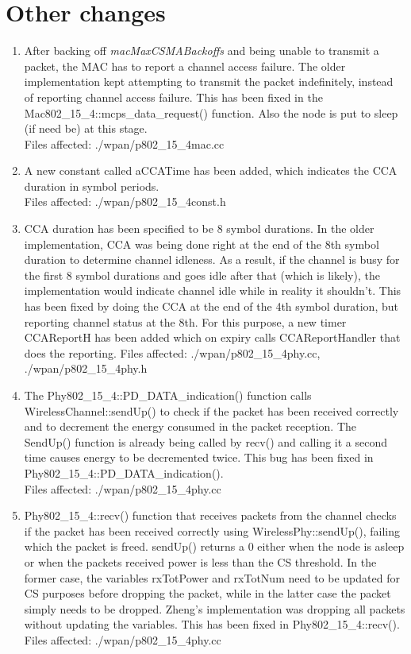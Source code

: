 \section{Other changes}
\begin{enumerate}
\item{After backing off \textit{macMaxCSMABackoffs} and being unable to transmit a packet,
the MAC has to report a channel access failure. The older implementation kept attempting to
transmit the packet indefinitely, instead of reporting channel access failure.
This has been fixed in the \mbox{Mac802\_15\_4::mcps\_data\_request()} function.
Also the node is put to sleep (if need be) at this stage.\\
Files affected: ./wpan/p802\_15\_4mac.cc}

\item{A new constant called aCCATime has been added, which indicates the CCA
duration in symbol periods.\\
Files affected:  ./wpan/p802\_15\_4const.h}

\item{CCA duration has been specified to be 8 symbol durations. In the older implementation,
CCA was being done right at the end of the 8th symbol duration to determine
channel idleness. As a result, if the channel is busy for the first
8 symbol durations and goes idle after that (which is likely), the
implementation would indicate channel idle while in reality it
shouldn't. This has been fixed by doing the CCA at the end of the
4th symbol duration, but reporting channel status at the 8th. For
this purpose, a new timer CCAReportH has been added which on expiry calls
CCAReportHandler that does the reporting.
Files affected:  ./wpan/p802\_15\_4phy.cc,  ./wpan/p802\_15\_4phy.h}

\item{The \mbox{Phy802\_15\_4::PD\_DATA\_indication()} function calls
\mbox{WirelessChannel::sendUp()} to check if the packet has been received correctly and
to decrement the energy consumed in the packet reception. The SendUp() function is already
being called by recv() and calling it a second time causes energy to be decremented twice.
This bug has been fixed in \mbox{Phy802\_15\_4::PD\_DATA\_indication()}.\\
Files affected: ./wpan/p802\_15\_4phy.cc}

\item{\mbox{Phy802\_15\_4::recv()} function that receives packets from the channel checks
if the packet has been received correctly using
\mbox{WirelessPhy::sendUp()}, failing which the packet is freed.
sendUp() returns a 0 either when the node is asleep or when the
packets received power is less than the CS threshold. In the former
case, the variables rxTotPower and rxTotNum need to be updated for
CS purposes before dropping the packet, while in the latter case the
packet simply needs to be dropped. Zheng's implementation was
dropping all packets without updating the variables. This has been
fixed in
\mbox{Phy802\_15\_4::recv()}.\\
Files affected: ./wpan/p802\_15\_4phy.cc}


\end{enumerate}
